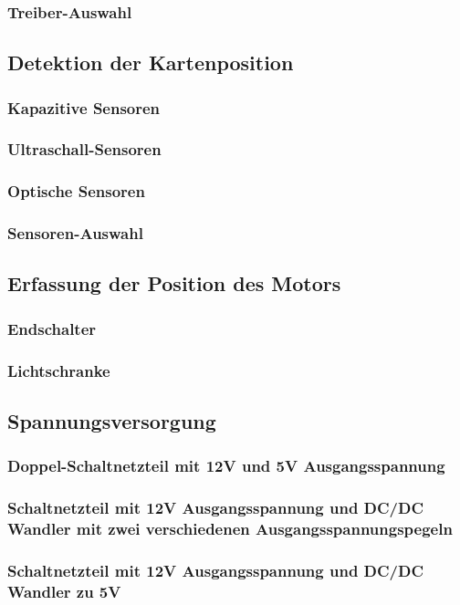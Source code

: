 \subsubsection{Treiber-Auswahl}


\subsection{Detektion der Kartenposition}
\subsubsection{Kapazitive Sensoren}
\subsubsection{Ultraschall-Sensoren}
\subsubsection{Optische Sensoren}
\subsubsection{Sensoren-Auswahl}

\subsection{Erfassung der Position des Motors}
\subsubsection{Endschalter}
\subsubsection{Lichtschranke}

\subsection{Spannungsversorgung}
\subsubsection{Doppel-Schaltnetzteil mit 12V und 5V Ausgangsspannung}
\subsubsection{Schaltnetzteil mit 12V Ausgangsspannung und DC/DC Wandler mit zwei verschiedenen Ausgangsspannungspegeln}
\subsubsection{Schaltnetzteil mit 12V Ausgangsspannung und DC/DC Wandler zu 5V}
